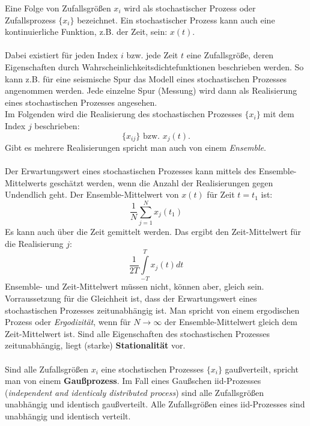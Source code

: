 Eine Folge von Zufallsgrößen ${x_i}$ wird als stochastischer Prozess oder Zufallsprozess $\{x_i\}$ bezeichnet. Ein stochastischer Prozess kann auch eine kontinuierliche Funktion, z.B. der Zeit, sein: $x(t)$.\\\\
Dabei existiert für jeden Index $i$ bzw. jede Zeit $t$ eine Zufallsgröße, deren Eigenschaften durch Wahrscheinlichkeitsdichtefunktionen beschrieben werden. So kann z.B. für eine seismische Spur das Modell eines stochastischen Prozesses angenommen werden. Jede einzelne Spur (Messung) wird dann als Realisierung eines stochastischen Prozesses angesehen.\\
Im Folgenden wird die Realisierung des stochastischen Prozesses $\{x_i\}$ mit dem Index $j$ beschrieben:
\[
\{x_{ij}\} \mbox{ bzw. }  x_j(t).
\]
Gibt es mehrere Realisierungen spricht man auch von einem \textit{Ensemble}.\\\\
Der Erwartungswert eines stochastischen Prozesses kann mittels des Ensemble-Mittelwerts geschätzt werden, wenn die Anzahl der Realisierungen gegen Undendlich geht. Der Ensemble-Mittelwert von $x(t)$ für Zeit $t=t_1$ ist:
\[
\frac{1}{N}\sum\limits_{j=1}^{N}x_j(t_1)
\]
Es kann auch über die Zeit gemittelt werden. Das ergibt den Zeit-Mittelwert für die Realisierung $j$:
\[
\frac{1}{2T}\int\limits_{-T}^{T}x_j(t)dt
\]
Ensemble- und Zeit-Mittelwert müssen nicht, können aber, gleich sein. Vorraussetzung für die Gleichheit ist, dass der Erwartungswert eines stochastischen Prozesses zeitunabhängig ist. Man spricht von einem ergodischen Prozess oder \textit{Ergodizität}, wenn für $N \to \infty$ der Ensemble-Mittelwert gleich dem Zeit-Mittelwert ist. Sind alle Eigenschaften des stochastischen Prozesses zeitunabhängig, liegt (starke) \textbf{Stationalität} vor.\\\\
Sind alle Zufallsgrößen $x_i$ eine stochstischen Prozesses $\{x_i\}$ gaußverteilt, spricht man von einem {\bf Gaußprozess}. Im Fall eines Gaußschen iid-Prozesses (\textsl{independent and identicaly distributed process}) sind alle Zufallsgrößen unabhängig und identisch gaußverteilt.
Alle Zufallsgrößen eines iid-Prozesses sind unabhängig und identisch verteilt.

\newpage


